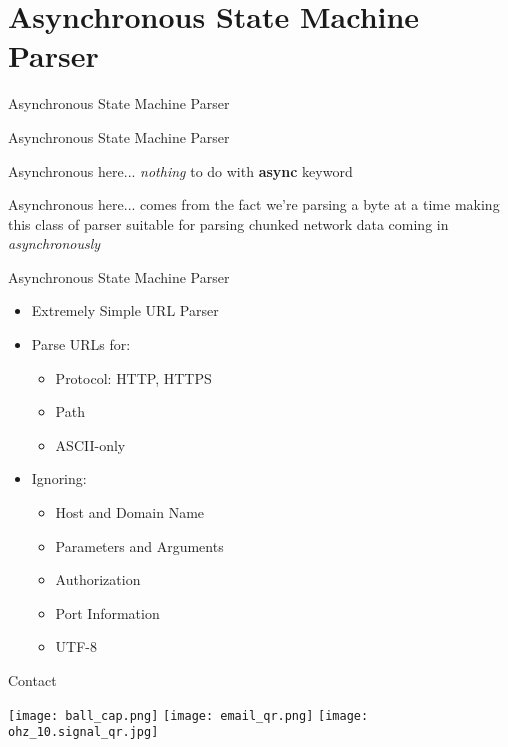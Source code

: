 \documentclass[aspectratio=169]{beamer}
\begin{document}
\section{Asynchronous State Machine Parser}
\begin{frame}
\begin{center}
\begin{Large}
Asynchronous State Machine Parser
\end{Large}
\end{center}
\end{frame}

\begin{frame}{Asynchronous State Machine Parser}
\begin{block}{Asynchronous here...}
\emph{nothing} to do with \textbf{async} keyword
\end{block}
\begin{block}{Asynchronous here...} comes from the fact we're parsing a byte at a time making this class of parser suitable for parsing chunked network data coming in \emph{asynchronously}
\end{block}
\end{frame}

\begin{frame}{Asynchronous State Machine Parser}
\begin{itemize}
\item Extremely Simple URL Parser
\item Parse URLs for:
	\begin{itemize}
	\item Protocol: {HTTP, HTTPS}
	\item Path
	\item ASCII-only
	\end{itemize}
\item Ignoring:
	\begin{itemize}
	\item Host and Domain Name
	\item Parameters and Arguments
	\item Authorization
	\item Port Information
	\item UTF-8
	\end{itemize}
\end{itemize}
\end{frame}

\begin{frame}{Contact}
\begin{center}
\texttt{[image: ball\_cap.png]}
\texttt{[image: email\_qr.png]}
\texttt{[image: ohz\_10.signal\_qr.jpg]}
\end{center}
\end{frame}
\end{document}
